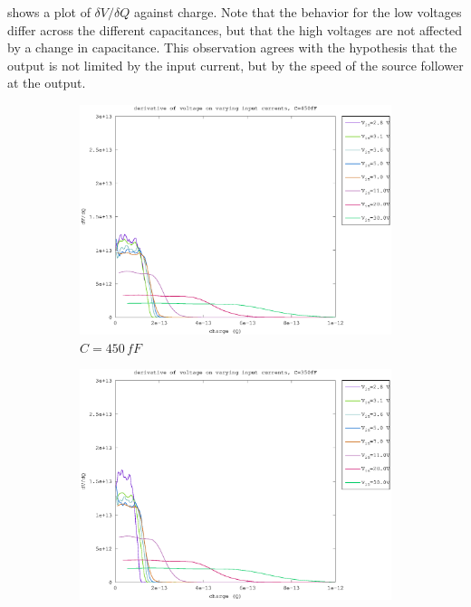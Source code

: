  shows a plot of $\delta V/\delta Q$ against charge. Note that the behavior for the low voltages differ across the different capacitances, but that the high voltages are not affected by a change in capacitance. This observation agrees with the hypothesis that the output is not limited by the input current, but by the speed of the source follower at the output.

\begin{figure}[h]
	\centering
	\begin{subfigure}[b]{0.475\textwidth}
	    \centering
	    \includegraphics[width=\textwidth]{fig/bre_d_slope_450fF.eps}
	    \caption[Network2]%
	    {$C=450\,fF$}    
	    \label{fig:bre_d_slopes_450fF}
	\end{subfigure}
	\hfill
	\begin{subfigure}[b]{0.475\textwidth}  
	    \centering 
	    \includegraphics[width=\textwidth]{fig/bre_d_slope_350fF.eps}

\end{subfigure}
\end{figure}
